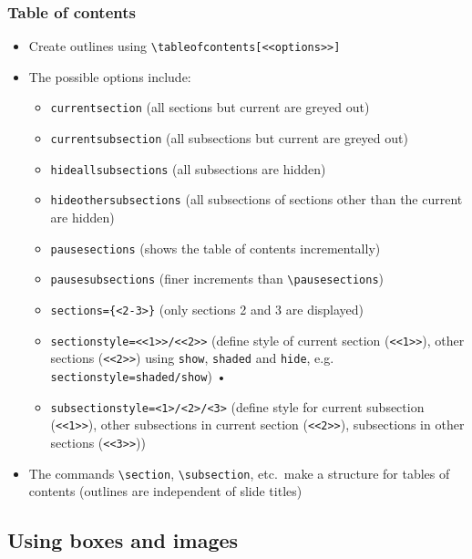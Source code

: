 \documentclass[xcolor=pdftex,t,11pt]{beamer}
\begin{document}
\begin{frame}
\frametitle{Table of contents}
\begin{itemize}
\item Create outlines using \verb!\tableofcontents[<<options>>]!
\item The possible options include:
\begin{itemize}
	\item \verb!currentsection! (all sections but current are greyed out)
        \item \verb!currentsubsection! (all subsections but current are greyed out)
 	\item \verb!hideallsubsections! (all subsections are hidden)
	\item \verb!hideothersubsections! (all subsections of sections other than the current are hidden)
  	\item \verb!pausesections! (shows the table of contents incrementally)
	\item \verb!pausesubsections! (finer increments than \verb!\pausesections!)
	\item \verb!sections={<2-3>}! (only sections 2 and 3 are displayed)
	\item \verb!sectionstyle=<<1>>/<<2>>! (define style of current section (\verb!<<1>>!), other sections (\verb!<<2>>!) using \verb!show!, \verb!shaded! and \verb!hide!, e.g. \verb!sectionstyle=shaded/show!)
• 	\item \verb!subsectionstyle=<1>/<2>/<3>! (define style for current subsection (\verb!<<1>>!), other subsections in current section (\verb!<<2>>!), subsections in other sections (\verb!<<3>>!))
\end{itemize}
\item The commands \verb!\section!, \verb!\subsection!, etc.\ make a structure for tables of contents (outlines are independent of slide titles)
\end{itemize}
\end{frame}

\subsection{Using boxes and images}
\end{document}
